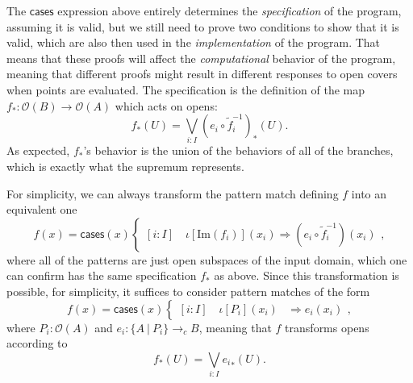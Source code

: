 \documentclass[conference]{IEEEtran}
\newcommand{\cto}{\to_c}
\newcommand{\suchthat}{\ |\ }
\newcommand{\Open}[1]{\mathcal{O}({#1})}
\newcommand{\Img}[1]{\text{Im}\left({#1}\right)}
\newcommand{\oinclf}[1]{\iota[{#1}]}
\newcommand{\oincl}[2]{\oinclf{#1} \left({#2}\right)}
\newcommand{\Branch}{\Rightarrow}
\begin{document}
The $\mathsf{cases}$ expression above entirely determines the \emph{specification} of the program, assuming it is valid, but we still need to prove two conditions to show that it is valid, which are also then used in the \emph{implementation} of the program. That means that these proofs will affect the \emph{computational} behavior of the program, meaning that different proofs might result in different responses to open covers when points are evaluated. The specification is the definition of the map $f_* : \Open{B} \to \Open{A}$ which acts on opens:
\[
f_*(U) = \bigvee_{i : I} (e_i \circ \tilde{f}_i^{-1})_*(U).
\]
As expected, $f_*$'s behavior is the union of the behaviors of all of the branches, which is exactly what the supremum represents.

For simplicity, we can always transform the pattern match defining $f$ into an equivalent one
\[
f(x) = \mathsf{cases}(x)
\begin{cases}
[i : I] \quad \oincl{\Img{f_i}}{x_i} \Branch (e_i \circ \tilde{f}_i^{-1})(x_i)
\end{cases},
\]
where all of the patterns are just open subspaces of the input domain, which one can confirm has the same specification $f_*$ as above. Since this transformation is possible, for simplicity, it suffices to consider pattern matches of the form
\[
f(x) = \mathsf{cases}(x)
\begin{cases}
[i : I] \quad \oincl{P_i}{x_i} &\Branch e_i(x_i)
\end{cases},
\]
where $P_i : \Open{A}$ and $e_i : \{ A \suchthat P_i \} \cto B$, meaning that $f$ transforms opens according to
\[
f_*(U) = \bigvee_{i : I} {e_i}_*(U).
\]
\end{document}
